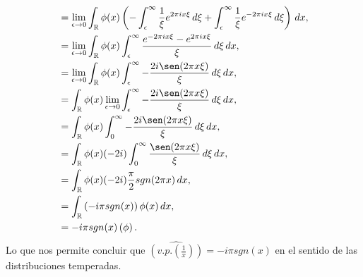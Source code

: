 \begin{homeworkProblem}
\begin{solution}
\begin{align*}
      &=\lim_{\epsilon \to 0}\int_{\mathbb{R}}\phi(x)\left(-\int_{\epsilon}^{\infty}\frac{1}{\xi}e^{2\pi ix\xi}\, d\xi+\int_{\epsilon}^{\infty}\frac{1}{\xi}e^{-2\pi ix\xi}\, d\xi\right)\, dx,\\
      &=\lim_{\epsilon \to 0}\int_{\mathbb{R}}\phi(x)\int_{\epsilon}^{\infty}\frac{e^{-2\pi ix\xi}-e^{2\pi ix\xi}}{\xi}\, d\xi\, dx,\\
      &=\lim_{\epsilon \to 0}\int_{\mathbb{R}}\phi(x)\int_{\epsilon}^{\infty}-\frac{2i\sen(2\pi x\xi)}{\xi}\, d\xi\, dx,\\
      &=\int_{\mathbb{R}}\phi(x)\lim_{\epsilon \to 0}\int_{\epsilon}^{\infty}-\frac{2i\sen(2\pi x\xi)}{\xi}\, d\xi\, dx,\\
      &=\int_{\mathbb{R}}\phi(x)\int_{0}^{\infty}-\frac{2i\sen(2\pi x\xi)}{\xi}\, d\xi\, dx,\\
      &=\int_{\mathbb{R}}\phi(x)(-2i)\int_{0}^{\infty}\frac{\sen(2\pi x\xi)}{\xi}\, d\xi\, dx,\\
      &=\int_{\mathbb{R}}\phi(x)(-2i)\frac{\pi}{2}sgn(2\pi x)\, dx,\\
      &=\int_{\mathbb{R}}\left( -i\pi sgn(x) \right)\phi(x)\, dx,\\
      &=-i\pi sgn(x)\left( \phi \right).
    \end{align*}
    Lo que nos permite concluir que $\hat{\left(v.p.\left( \frac{1}{x} \right)\right)}=-i\pi sgn(x)$ en el sentido de las distribuciones temperadas.
  \end{solution}
\end{homeworkProblem}
